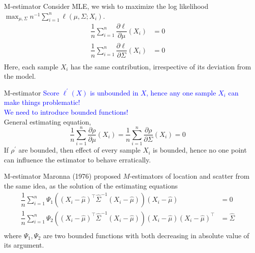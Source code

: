 \documentclass[10pt,xcolor=svgnames]{beamer} %
\newcommand{\tr}{^{\intercal}}
\begin{document}
\begin{frame}{M-estimator}
    Consider MLE, we wish to maximize the log likelihood $\max_{\mu, \Sigma}n^{-1}\sum_{i=1}^n \ell(\mu, \Sigma; X_i)$.
    \begin{equation*}
       \begin{split}
            \dfrac{1}{n}\sum_{i=1}^n \dfrac{\partial \ell}{\partial \mu}(X_i) & = 0\\
            \dfrac{1}{n}\sum_{i=1}^n \dfrac{\partial \ell}{\partial \Sigma}(X_i) & = 0\\
       \end{split}
    \end{equation*}
    Here, each sample $X_i$ has the same contribution, irrespective of its deviation from the model.
\end{frame}

\begin{frame}{M-estimator}
    \textcolor{blue}{Score $\ell^{\prime}(X)$ is unbounded in $X$, hence any one sample $X_i$ can make things problematic!}\\
    \textcolor{blue}{We need to introduce bounded functions!}\\
    \pause
    General estimating equation,
    \begin{equation*}
        \dfrac{1}{n}\sum_{i=1}^n \dfrac{\partial \rho}{\partial \mu}(X_i) = \dfrac{1}{n}\sum_{i=1}^n \dfrac{\partial \rho}{\partial \Sigma}(X_i) = 0
    \end{equation*}
    If $\rho^{\prime}$ are bounded, then effect of every sample $X_i$ is bounded, hence no one point can influence the estimator to behave erratically.
\end{frame}

\begin{frame}{M-estimator}
    Maronna (1976) proposed $M$-estimators of location and scatter from the same idea, as the solution of the estimating equations
    \begin{align*}
        \dfrac{1}{n}\sum_{i=1}^n \Psi_1\left( (X_i - \widehat{\mu})\tr\widehat{\Sigma}^{-1}(X_i - \widehat{\mu}) \right)(X_i - \widehat{\mu}) & = 0\\
        \dfrac{1}{n}\sum_{i=1}^n \Psi_2\left( (X_i - \widehat{\mu})\tr\widehat{\Sigma}^{-1}(X_i - \widehat{\mu}) \right)(X_i - \widehat{\mu})(X_i - \widehat{\mu})\tr & = \widehat{\Sigma}\\
    \end{align*}
    \noindent where $\Psi_1, \Psi_2$ are two bounded functions with both decreasing in absolute value of its argument.
\end{frame}
\end{document}
